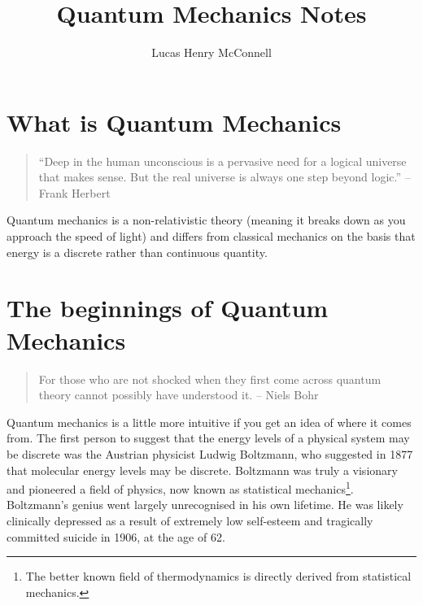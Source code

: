 \documentclass{article}
\title{Quantum Mechanics Notes}
\author{Lucas Henry McConnell}
\begin{document}
\maketitle

\section{What is Quantum Mechanics}
\begin{quote}
``Deep in the human unconscious is a pervasive need for a logical universe that makes sense. But the real universe is always one step beyond logic.'' -- Frank Herbert
\end{quote}
\begin{figure}[h]
\end{figure}
Quantum mechanics is a non-relativistic theory (meaning it breaks down as you approach the speed of light) and differs from classical mechanics on the basis that energy is a discrete rather than continuous quantity.
\newpage
\section{The beginnings of Quantum Mechanics}
\begin{quote}
For those who are not shocked when they first come across quantum theory cannot possibly have understood it. -- Niels Bohr
\end{quote}
Quantum mechanics is a little more intuitive if you get an idea of where it comes from. The first person to suggest that the energy levels of a physical system may be discrete was the Austrian physicist Ludwig Boltzmann, who suggested in 1877 that molecular energy levels may be discrete. Boltzmann was truly a visionary and pioneered a field of physics, now known as statistical mechanics\footnote{The better known field of thermodynamics is directly derived from statistical mechanics.}. Boltzmann's genius went largely unrecognised in his own lifetime. He was likely clinically depressed as a result of extremely low self-esteem and tragically committed suicide in 1906, at the age of 62. 
\end{document}
